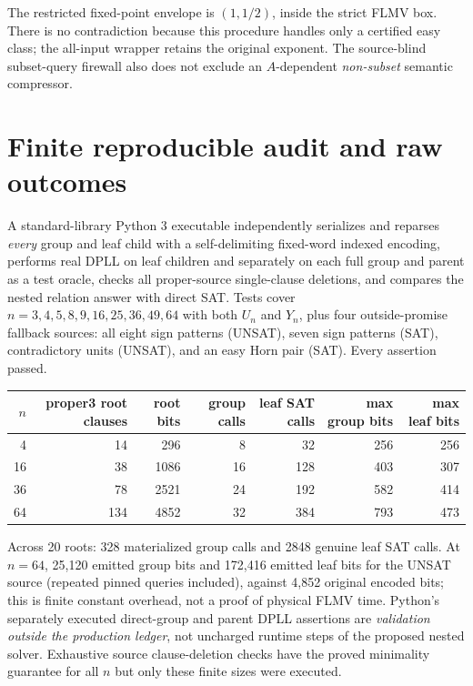 \documentclass[11pt]{article}
\begin{document}
The restricted fixed-point envelope is $(1,1/2)$, inside the strict FLMV box. There is no contradiction because this procedure handles only a certified easy class; the all-input wrapper retains the original exponent. The source-blind subset-query firewall also does not exclude an $A$-dependent \emph{non-subset} semantic compressor.

\section{Finite reproducible audit and raw outcomes}
A standard-library Python 3 executable independently serializes and reparses \emph{every} group and leaf child with a self-delimiting fixed-word indexed encoding, performs real DPLL on leaf children and separately on each full group and parent as a test oracle, checks all proper-source single-clause deletions, and compares the nested relation answer with direct SAT. Tests cover $n=3,4,5,8,9,16,25,36,49,64$ with both $U_n$ and $Y_n$, plus four outside-promise fallback sources: all eight sign patterns (UNSAT), seven sign patterns (SAT), contradictory units (UNSAT), and an easy Horn pair (SAT). Every assertion passed.
\begin{center}\small
\begin{tabular}{rrrrrrr}\toprule
$n$ & proper3 root clauses & root bits & group calls & leaf SAT calls & max group bits & max leaf bits\\\midrule
4 &14&296&8&32&256&256\\
16&38&1086&16&128&403&307\\
36&78&2521&24&192&582&414\\
64&134&4852&32&384&793&473\\\bottomrule
\end{tabular}
\end{center}
Across 20 roots: 328 materialized group calls and 2848 genuine leaf SAT calls. At $n=64$, 25,120 emitted group bits and 172,416 emitted leaf bits for the UNSAT source (repeated pinned queries included), against 4,852 original encoded bits; this is finite constant overhead, not a proof of physical FLMV time. Python's separately executed direct-group and parent DPLL assertions are \emph{validation outside the production ledger}, not uncharged runtime steps of the proposed nested solver. Exhaustive source clause-deletion checks have the proved minimality guarantee for all $n$ but only these finite sizes were executed.
\end{document}
